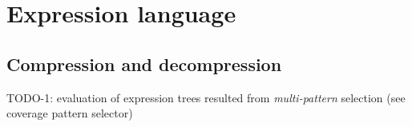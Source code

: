 
\chapter{Expression language} %





% 







\section{Compression and decompression}
\label{sec:exprlang:compdecomp}

TODO-1: evaluation of expression trees resulted from \textit{multi-pattern} selection (see coverage pattern selector)

